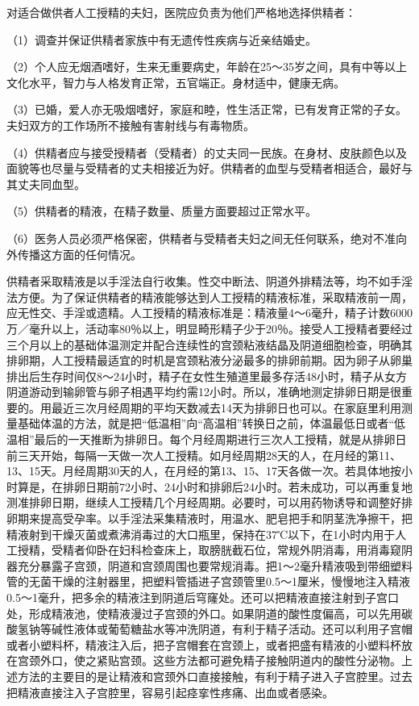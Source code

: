 \documentclass[12pt,UTF8,openany]{ctexbook}
\begin{document}
对适合做供者人工授精的夫妇，医院应负责为他们严格地选择供精者：

（1）调查并保证供精者家族中有无遗传性疾病与近亲结婚史。

（2）个人应无烟酒嗜好，生来无重要病史，年龄在25～35岁之间，具有中等以上文化水平，智力与人格发育正常，五官端正。身材适中，健康无病。

（3）已婚，爱人亦无吸烟嗜好，家庭和睦，性生活正常，已有发育正常的子女。夫妇双方的工作场所不接触有害射线与有毒物质。

（4）供精者应与接受授精者（受精者）的丈夫同一民族。在身材、皮肤颜色以及面貌等也尽量与受精者的丈夫相接近为好。供精者的血型与受精者相适合，最好与其丈夫同血型。

（5）供精者的精液，在精子数量、质量方面要超过正常水平。

（6）医务人员必须严格保密，供精者与受精者夫妇之间无任何联系，绝对不准向外传播这方面的任何情况。

供精者采取精液是以手淫法自行收集。性交中断法、阴道外排精法等，均不如手淫法方便。为了保证供精者的精液能够达到人工授精的精液标准，采取精液前一周，应无性交、手淫或遗精。人工授精的精液标准是：精液量4～6毫升，精子计数6000万／毫升以上，活动率80％以上，明显畸形精子少于20％。接受人工授精者要经过三个月以上的基础体温测定并配合连续性的宫颈粘液结晶及阴道细胞检查，明确其排卵期，人工授精最适宜的时机是宫颈粘液分泌最多的排卵前期。因为卵子从卵巢排出后生存时间仅8～24小时，精子在女性生殖道里最多存活48小时，精子从女方阴道游动到输卵管与卵子相遇平均约需12小时。所以，准确地测定排卵日期是很重要的。用最近三次月经周期的平均天数减去14天为排卵日也可以。在家庭里利用测量基础体温的方法，就是把“低温相”向“高温相”转换日之前，体温最低日或者“低温相”最后的一天推断为排卵日。每个月经周期进行三次人工授精，就是从排卵日前三天开始，每隔一天做一次人工授精。如月经周期28天的人，在月经的第11、13、15天。月经周期30天的人，在月经的第13、15、17天各做一次。若具体地按小时算是，在排卵日期前72小时、24小时和排卵后24小时。若未成功，可以再重复地测准排卵日期，继续人工授精几个月经周期。必要时，可以用药物诱导和调整好排卵期来提高受孕率。以手淫法采集精液时，用温水、肥皂把手和阴茎洗净擦干，把精液射到干燥灭菌或煮沸消毒过的大口瓶里，保持在37℃以下，在1小时内用于人工授精，受精者仰卧在妇科检查床上，取膀胱截石位，常规外阴消毒，用消毒窥阴器充分暴露子宫颈，阴道和宫颈周围也要常规消毒。把1～2毫升精液吸到带细塑料管的无菌干燥的注射器里，把塑料管插进子宫颈管里0.5～1厘米，慢慢地注入精液0.5～1毫升，把多余的精液注到阴道后穹窿处。还可以把精液直接注射到子宫口处，形成精液池，使精液漫过子宫颈的外口。如果阴道的酸性度偏高，可以先用碳酸氢钠等碱性液体或葡萄糖盐水等冲洗阴道，有利于精子活动。还可以利用子宫帽或者小塑料杯，精液注入后，把子宫帽套在宫颈上，或者把盛有精液的小塑料杯放在宫颈外口，使之紧贴宫颈。这些方法都可避免精子接触阴道内的酸性分泌物。上述方法的主要目的是让精液和宫颈外口直接接触，有利于精子进入子宫腔里。过去把精液直接注入子宫腔里，容易引起痉挛性疼痛、出血或者感染。
\end{document}
